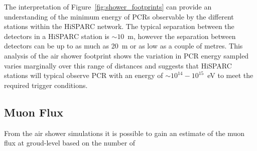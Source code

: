 The interpretation of Figure~\ref{fig:shower_footprints} can provide an understanding of the minimum energy of PCRs observable by the different stations within the HiSPARC network. The typical separation between the detectors in a HiSPARC station is $\sim 10$~m, however the separation between detectors can be up to as much as 20~m or as low as a couple of metres. This analysis of the air shower footprint shows the variation in PCR energy sampled varies marginally over this range of distances and suggests that HiSPARC stations will typical observe PCR with an energy of $\sim 10^{14}-10^{15}$~eV to meet the required trigger conditions.



\subsection{Muon Flux}\label{sec:CORSIKA_flux}

From the air shower simulations it is possible to gain an estimate of the muon flux at groud-level based on the number of 

